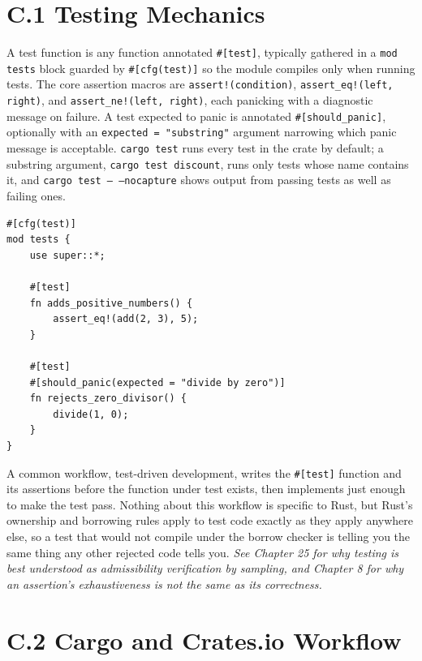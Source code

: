 \documentclass[11pt]{book}
\begin{document}
\section*{C.1 Testing Mechanics}

A test function is any function annotated \texttt{\#[test]}, typically gathered in a \texttt{mod tests} block guarded by \texttt{\#[cfg(test)]} so the module compiles only when running tests. The core assertion macros are \texttt{assert!(condition)}, \texttt{assert\_eq!(left, right)}, and \texttt{assert\_ne!(left, right)}, each panicking with a diagnostic message on failure. A test expected to panic is annotated \texttt{\#[should\_panic]}, optionally with an \texttt{expected = "substring"} argument narrowing which panic message is acceptable. \texttt{cargo test} runs every test in the crate by default; a substring argument, \texttt{cargo test discount}, runs only tests whose name contains it, and \texttt{cargo test -- --nocapture} shows output from passing tests as well as failing ones.

\begin{lstlisting}
#[cfg(test)]
mod tests {
    use super::*;

    #[test]
    fn adds_positive_numbers() {
        assert_eq!(add(2, 3), 5);
    }

    #[test]
    #[should_panic(expected = "divide by zero")]
    fn rejects_zero_divisor() {
        divide(1, 0);
    }
}
\end{lstlisting}

A common workflow, test-driven development, writes the \texttt{\#[test]} function and its assertions before the function under test exists, then implements just enough to make the test pass. Nothing about this workflow is specific to Rust, but Rust's ownership and borrowing rules apply to test code exactly as they apply anywhere else, so a test that would not compile under the borrow checker is telling you the same thing any other rejected code tells you. \emph{See Chapter 25 for why testing is best understood as admissibility verification by sampling, and Chapter 8 for why an assertion's exhaustiveness is not the same as its correctness.}

\section*{C.2 Cargo and Crates.io Workflow}
\end{document}
